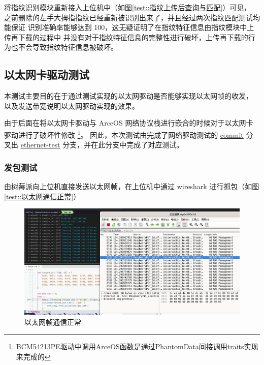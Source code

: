     将指纹识别模块重新接入上位机中（如图\ref{test::指纹上传后查询与匹配}）可见，
    之前删除的左手大拇指指纹已经重新被识别出来了，并且经过两次指纹匹配测试均能保证
    识别准确率能够达到 100，这无疑证明了在指纹特征信息由指纹模块中上传再下载的过程中
    并没有对于指纹特征信息的完整性进行破坏，上传再下载的行为也不会导致指纹特征信息被破坏。

    \subsection{以太网卡驱动测试}

    本测试主要目的在于通过测试实现的以太网驱动是否能够实现以太网帧的收发，
    以及发送带宽说明以太网驱动实现的效果。

    由于后面在将以太网卡驱动与 ArceOS 网络协议栈进行嵌合的时候对于以太网卡驱动进行了破坏性修改
    \footnote{BCM54213PE驱动中调用ArceOS函数是通过PhantomData间接调用traits实现来完成的}。
    因此，本次测试由完成了网络驱动测试的 \href{https://bitbucket.org/jackyliu16/arceos/commits/92e9b6abcdf180359381088552688c0fcbc83bf2}{commit} 
    分叉出 \href{https://bitbucket.org/jackyliu16/arceos/commits/branch/ethernet-test}{ethernet-test}
    分支，并在此分支中完成了对应测试。

    \subsubsection{发包测试}

    由树莓派向上位机直接发送以太网帧，在上位机中通过 wireshark 进行抓包（如图\ref{test::以太网通信正常}）

    \begin{figure}[ht]
        \centering
        \includegraphics[width=\textwidth]{./imgs/以太网帧通信正常.jpg}
        \caption{以太网帧通信正常}    \label{test::以太网帧发送}
    \end{figure}   

